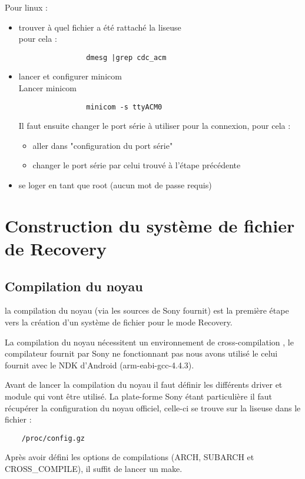 Pour linux : 
\begin{itemize}
	\item trouver à quel fichier a été rattaché la liseuse \\
		pour cela : 
			\begin{verbatim}
				dmesg |grep cdc_acm
			\end{verbatim}
	\item lancer et configurer minicom \\
		Lancer minicom\\
			\begin{verbatim}
				minicom -s ttyACM0
			\end{verbatim}
		Il faut ensuite changer le port série à utiliser pour la connexion, pour cela : \\	
		\begin{itemize}
			\item aller dans "configuration du port série"
			\item changer le port série par celui trouvé à l'étape précédente
		\end{itemize}
	\item se loger en tant que root (aucun mot de passe requis)
\end{itemize}

\section{Construction du système de fichier de Recovery}
\subsection{Compilation du noyau}

la compilation du noyau (via les sources de Sony fournit) est la première étape vers la création d'un système de fichier pour le mode Recovery.

La compilation du noyau nécessitent un environnement de cross-compilation , le compilateur fournit par Sony ne fonctionnant pas nous avons utilisé le celui fournit avec le NDK d'Android (arm-eabi-gcc-4.4.3).

Avant de lancer la compilation du noyau il faut définir les différents driver et module qui vont être utilisé. La plate-forme Sony étant particulière il faut récupérer la configuration du noyau officiel, celle-ci se trouve sur la liseuse dans le fichier : 
\begin{verbatim}
	/proc/config.gz
\end{verbatim}
 Après avoir défini les options de compilations (ARCH, SUBARCH et CROSS_COMPILE), il suffit de lancer un make.
 
